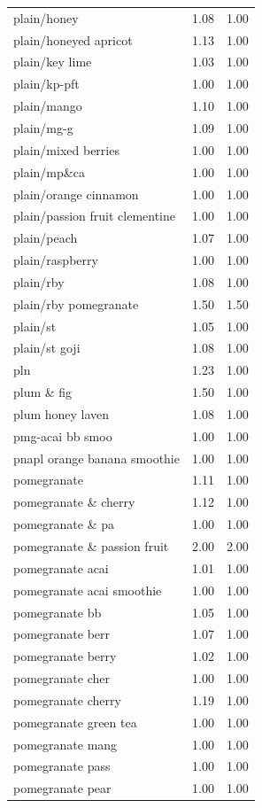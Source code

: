 \begin{table}
\begin{tabular}{lrr}
plain/honey & 1.08 & 1.00 \\
plain/honeyed apricot & 1.13 & 1.00 \\
plain/key lime & 1.03 & 1.00 \\
plain/kp-pft & 1.00 & 1.00 \\
plain/mango & 1.10 & 1.00 \\
plain/mg-g & 1.09 & 1.00 \\
plain/mixed berries & 1.00 & 1.00 \\
plain/mp\&ca & 1.00 & 1.00 \\
plain/orange cinnamon & 1.00 & 1.00 \\
plain/passion fruit clementine & 1.00 & 1.00 \\
plain/peach & 1.07 & 1.00 \\
plain/raspberry & 1.00 & 1.00 \\
plain/rby & 1.08 & 1.00 \\
plain/rby pomegranate & 1.50 & 1.50 \\
plain/st & 1.05 & 1.00 \\
plain/st goji & 1.08 & 1.00 \\
pln & 1.23 & 1.00 \\
plum \& fig & 1.50 & 1.00 \\
plum honey laven & 1.08 & 1.00 \\
pmg-acai bb smoo & 1.00 & 1.00 \\
pnapl orange banana smoothie & 1.00 & 1.00 \\
pomegranate & 1.11 & 1.00 \\
pomegranate \& cherry & 1.12 & 1.00 \\
pomegranate \& pa & 1.00 & 1.00 \\
pomegranate \& passion fruit & 2.00 & 2.00 \\
pomegranate acai & 1.01 & 1.00 \\
pomegranate acai smoothie & 1.00 & 1.00 \\
pomegranate bb & 1.05 & 1.00 \\
pomegranate berr & 1.07 & 1.00 \\
pomegranate berry & 1.02 & 1.00 \\
pomegranate cher & 1.00 & 1.00 \\
pomegranate cherry & 1.19 & 1.00 \\
pomegranate green tea & 1.00 & 1.00 \\
pomegranate mang & 1.00 & 1.00 \\
pomegranate pass & 1.00 & 1.00 \\
pomegranate pear & 1.00 & 1.00 \\

\end{tabular}
\end{table}
